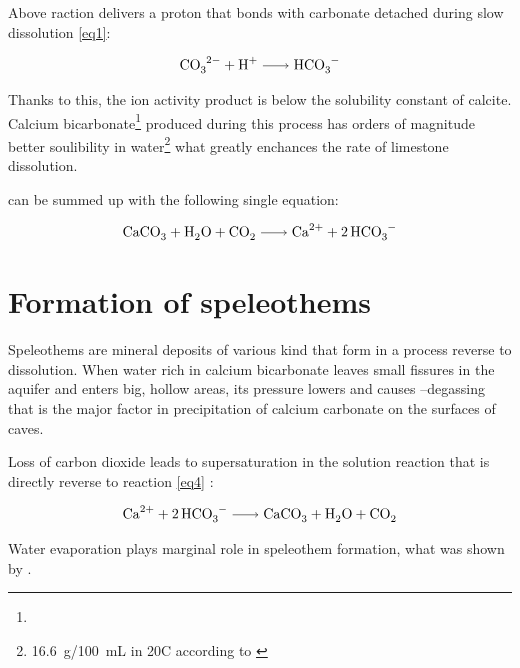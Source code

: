 Above raction delivers a proton that bonds with carbonate detached during slow
dissolution \ref{eq1}:

\begin{equation}
  \ce{CO3^2- + H^+ -> HCO3^-}
  \label{eq3}
\end{equation}

Thanks to this, the ion activity product   is below the
solubility constant of calcite. Calcium bicarbonate\footnote{} produced
during this process has orders of magnitude better soulibility in water\footnote{16.6~g/100~mL in 20\degree C according to \cite{aylward2008si}}
what greatly enchances the rate of limestone dissolution.

 can be summed up with the following single
equation:

\begin{equation}
  \ce{CaCO3 + H2O + CO2 -> Ca^2+ + 2HCO3^- }
  \label{eq4}
\end{equation}

\section{Formation of speleothems}

Speleothems are mineral deposits of various kind that form in a process reverse
to dissolution. When water rich in calcium bicarbonate leaves small fissures in
the aquifer and enters big, hollow areas, its pressure lowers and causes
--degassing that is the major factor in precipitation of calcium carbonate
on the surfaces of caves.

Loss of carbon dioxide leads to supersaturation in the solution reaction that
is directly reverse to reaction \ref{eq4} \parencite{fairchild2012speleothem}:

\begin{equation}
  \ce{Ca^2+ + 2HCO3^- -> CaCO3 + H2O + CO2}
  \label{eq:precipation}
\end{equation}

Water evaporation plays marginal role in speleothem formation, what was shown
by \cite{holland1964cave}.

